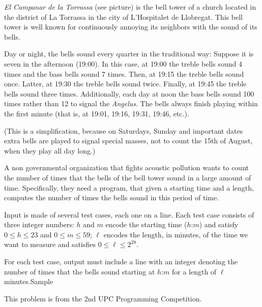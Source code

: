 

\Statement


\emph{El Campanar de la Torrassa} (see picture) is the bell tower of a church
located in the district of La Torrassa in the city of L'Hospitalet de
Llobregat. This bell tower is well known for continuously annoying its
neighbors with the sound of its bells.

Day or night, the bells sound every quarter in the traditional way: Suppose it
is seven in the afternoon (19:00). In this case, at 19:00 the treble bells
sound 4 times and the bass bells sound 7 times. Then, at 19:15 the treble
bells sound once. Latter, at 19:30 the treble bells sound twice. Finally, at
19:45 the treble bells sound three times.  Additionally, each day at noon the
bass bells sound 100 times rather than 12 to signal the \emph{Angelus}. The
bells always finish playing within the first minute (that is, at 19:01, 19:16,
19:31, 19:46, etc.).

\medskip

(This is a simplification, because on Saturdays, Sunday and important dates
extra bells are played to signal special masses, not to count the 15th of
August, when they play all day long.)

\medskip

A non governmental organization that fights acoustic pollution wants to count
the number of times that the bells of the bell tower sound in a large amount of
time. Specifically, they need a program, that given a starting time and a
length, computes the number of times the bells sound in this period of time.

\Input

Input is made of several test cases, each one on a line. Each test case
consists of three integer numbers:
$h$ and $m$ encode the starting
time ($h$:$m$) and satisfy $0\le h\le 23$ and $0\le m\le 59$;
$\ell$ encodes the length, in
minutes, of the time we want to measure and satisfies $0\le\ell\le2^{28}$.

\Output

For each test case, output must include a line with an integer denoting the
number of times that the bells sound starting at $h$:$m$ for a length of $\ell$
minutes.Sample

\Observation

This problem is from the 2nd UPC Programming Competition.

